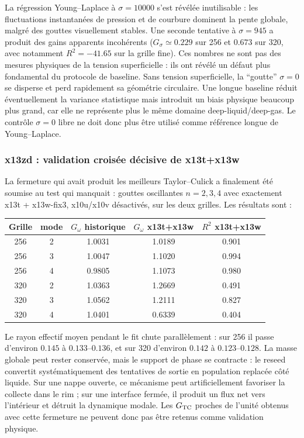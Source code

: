 \documentclass[11pt,a4paper]{article}
\begin{document}
La régression Young--Laplace à $\sigma=10000$ s'est révélée inutilisable : les fluctuations instantanées de pression et de courbure dominent la pente globale, malgré des gouttes visuellement stables. Une seconde tentative à $\sigma=945$ a produit des gains apparents incohérents ($G_\sigma\simeq0.229$ sur 256 et $0.673$ sur 320, avec notamment $R^2=-41.65$ sur la grille fine). Ces nombres ne sont pas des mesures physiques de la tension superficielle : ils ont révélé un défaut plus fondamental du protocole de baseline. Sans tension superficielle, la ``goutte'' $\sigma=0$ se disperse et perd rapidement sa géométrie circulaire. Une longue baseline réduit éventuellement la variance statistique mais introduit un biais physique beaucoup plus grand, car elle ne représente plus le même domaine deep-liquid/deep-gas. Le contrôle $\sigma=0$ libre ne doit donc plus être utilisé comme référence longue de Young--Laplace.

\subsubsection{x13zd : validation croisée décisive de x13t+x13w}

La fermeture qui avait produit les meilleurs Taylor--Culick a finalement été soumise au test qui manquait : gouttes oscillantes $n=2,3,4$ avec exactement x13t + x13w-fix3, x10u/x10v désactivés, sur les deux grilles. Les résultats sont :
\begin{center}
\begin{tabular}{ccccc}
\toprule
Grille & mode & $G_\omega$ historique & $G_\omega$ x13t+x13w & $R^2$ x13t+x13w \\
\midrule
256 & 2 & 1.0031 & 1.0189 & 0.901 \\
256 & 3 & 1.0047 & 1.1020 & 0.994 \\
256 & 4 & 0.9805 & 1.1073 & 0.980 \\
320 & 2 & 1.0363 & 1.2669 & 0.491 \\
320 & 3 & 1.0562 & 1.2111 & 0.827 \\
320 & 4 & 1.0401 & 0.6339 & 0.404 \\
\bottomrule
\end{tabular}
\end{center}
Le rayon effectif moyen pendant le fit chute parallèlement : sur 256 il passe d'environ $0.145$ à $0.133$--$0.136$, et sur 320 d'environ $0.142$ à $0.123$--$0.128$. La masse globale peut rester conservée, mais le support de phase se contracte : le reseed convertit systématiquement des tentatives de sortie en population replacée côté liquide. Sur une nappe ouverte, ce mécanisme peut artificiellement favoriser la collecte dans le rim ; sur une interface fermée, il produit un flux net vers l'intérieur et détruit la dynamique modale. Les $G_{\rm TC}$ proches de l'unité obtenus avec cette fermeture ne peuvent donc pas être retenus comme validation physique.
\end{document}
